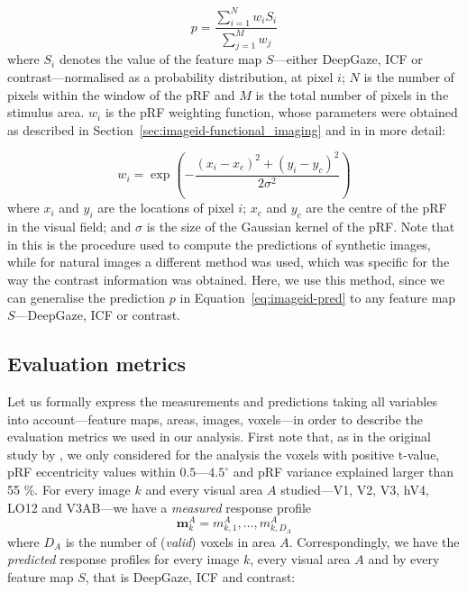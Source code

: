 {\begin{equation}
\label{eq:imageid-pred}
    p = \frac{\sum_{i=1}^{N}w_i S_i}{\sum_{j=1}^{M}w_j}
\end{equation}
%
where $S_i$ denotes the value of the feature map $S$---either DeepGaze, ICF or contrast---normalised as a probability distribution, at pixel $i$; $N$ is the number of pixels within the window of the pRF and $M$ is the total number of pixels in the stimulus area. $w_i$ is the pRF weighting function, whose parameters were obtained as described in Section~\ref{sec:imageid-functional_imaging} and in \citep{zuiderbaan2017imageidentification} in more detail:

\begin{equation}
\label{eq:imageid-prf}
    w_i = \exp\left(-\frac{(x_i-x_c)^2+(y_i-y_c)^2}{2\sigma^2}\right)
\end{equation}
%
where $x_i$ and $y_i$ are the locations of pixel $i$; $x_c$ and $y_c$ are the centre of the pRF in the visual field; and $\sigma$ is the size of the Gaussian kernel of the pRF. Note that in \citep{zuiderbaan2017imageidentification} this is the procedure used to compute the predictions of synthetic images, while for natural images a different method was used, which was specific for the way the contrast information was obtained. Here, we use this method, since we can generalise the prediction $p$ in Equation~\ref{eq:imageid-pred} to any feature map $S$---DeepGaze, ICF or contrast.

\subsection{Evaluation metrics}
Let us formally express the measurements and predictions taking all variables into account---feature maps, areas, images, voxels---in order to describe the evaluation metrics we used in our analysis. First note that, as in the original study by \citet{zuiderbaan2017imageidentification}, we only considered for the analysis the voxels with positive t-value, pRF eccentricity values within $0.5\text{---}4.5^{\circ}$ and pRF variance explained larger than 55 \%. For every image $k$ and every visual area $A$ studied---V1, V2, V3, hV4, LO12 and V3AB---we have a \textit{measured} response profile 
%
\[
    \mathbf{m}_{k}^{A} = m_{k, 1}^{A}, \ldots, m_{k, D_A}^{A}
\]
%
where $D_A$ is the number of (\textit{valid}) voxels in area $A$. Correspondingly, we have the \textit{predicted} response profiles for every image $k$, every visual area $A$ and by every feature map $S$, that is DeepGaze, ICF and contrast:

}
